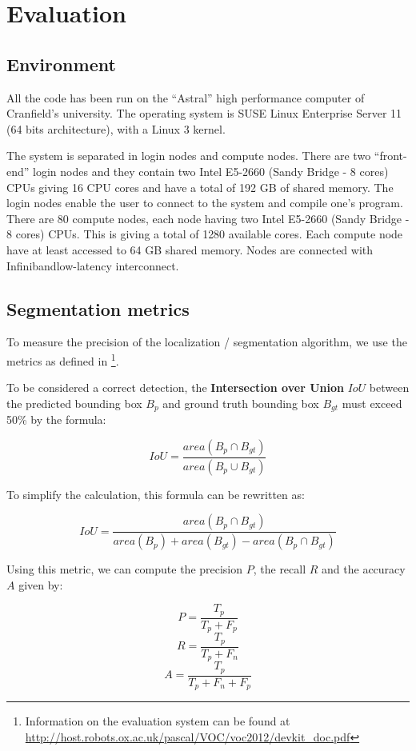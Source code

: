 \chapter{Evaluation} \label{sec:evaluation}

\section{Environment}

All the code has been run on the \enquote{Astral} high performance computer of Cranfield's university. The operating system is SUSE Linux Enterprise Server 11 (64 bits architecture), with a Linux 3 kernel.

The system is separated in login nodes and compute nodes. There are two \enquote{front-end} login nodes and they contain two Intel E5-2660 (Sandy Bridge - 8 cores) CPUs giving 16 CPU cores and have a total of 192 GB of shared memory. The login nodes enable the user to connect to the system and compile one's program. There are 80 compute nodes, each node having two Intel E5-2660 (Sandy Bridge - 8 cores) CPUs. This is giving a total of 1280 available cores. Each compute node have at least accessed to 64 GB shared memory. Nodes are connected with Infiniband\TM low-latency interconnect.

\section{Segmentation metrics}

To measure the precision of the localization / segmentation algorithm, we use the metrics as defined in \cite{pascalVoc2012} \footnote{Information on the evaluation system can be found at  \url{http://host.robots.ox.ac.uk/pascal/VOC/voc2012/devkit_doc.pdf}}.

To be considered a correct detection, the \textbf{Intersection over Union} $IoU$ between the predicted bounding box $B_p$ and ground truth bounding box $B_{gt}$ must exceed 50\% by the formula:

$$IoU = \frac{area(B_p \cap B_{gt})}{area(B_p \cup B_{gt})}$$

To simplify the calculation, this formula can be rewritten as:

$$IoU = \frac{area(B_p \cap B_{gt})}{area(B_p) + area(B_{gt}) - area(B_p \cap B_{gt})} $$

Using this metric, we can compute the precision $P$, the recall $R$ and the accuracy $A$ given by:

$$ P =  \frac{T_p}{T_p + F_p}$$
$$ R =  \frac{T_p}{T_p + F_n}$$
$$ A = \frac{T_p}{T_p + F_n + F_p} $$

